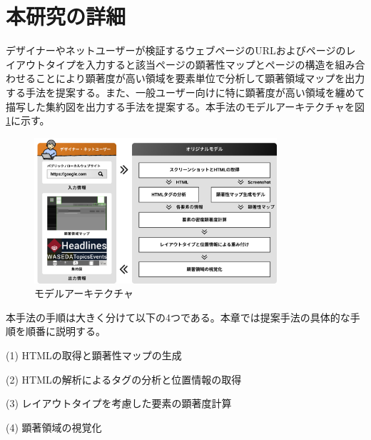 \newpage
\renewcommand{\baselinestretch}{1.5}
\section{本研究の詳細}
\renewcommand{\baselinestretch}{1}

\par デザイナーやネットユーザーが検証するウェブページのURLおよびページのレイアウトタイプを入力すると該当ページの顕著性マップとページの構造を組み合わせることにより顕著度が高い領域を要素単位で分析して顕著領域マップを出力する手法を提案する。また、一般ユーザー向けに特に顕著度が高い領域を纏めて描写した集約図を出力する手法を提案する。本手法のモデルアーキテクチャを図\ref{fig_ourmodel}に示す。

\begin{figure}[H]
    \centering
    \includegraphics[width=9cm]{figures/model.jpg}
    \caption{モデルアーキテクチャ}
    \label{fig_ourmodel}
\end{figure}

\par 本手法の手順は大きく分けて以下の4つである。本章では提案手法の具体的な手順を順番に説明する。
\par(1) HTMLの取得と顕著性マップの生成
\par(2) HTMLの解析によるタグの分析と位置情報の取得
\par(3) レイアウトタイプを考慮した要素の顕著度計算
\par(4) 顕著領域の視覚化\\

\newpage
